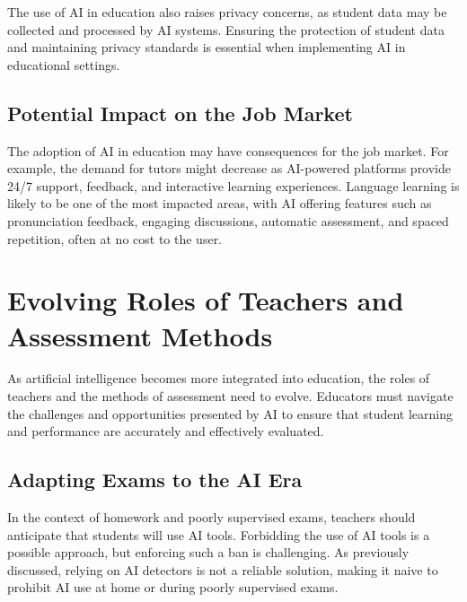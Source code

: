 \documentclass{article}
\begin{document}
The use of AI in education also raises privacy concerns, as student data may be collected and processed by AI systems. Ensuring the protection of student data and maintaining privacy standards is essential when implementing AI in educational settings.

\subsection{Potential Impact on the Job Market}

The adoption of AI in education may have consequences for the job market.
For example, the demand for tutors might decrease as AI-powered platforms
provide 24/7 support, feedback, and interactive learning experiences.
Language learning is likely to be one of the most impacted areas, with
AI offering features such as pronunciation feedback, engaging discussions,
automatic assessment, and spaced repetition, often at no cost to the user.






\newpage

\section{Evolving Roles of Teachers and Assessment Methods}

As artificial intelligence becomes more integrated into education, the roles of teachers and the methods of assessment need to evolve. Educators must navigate the challenges and opportunities presented by AI to ensure that student learning and performance are accurately and effectively evaluated.

\subsection{Adapting Exams to the AI Era}

In the context of homework and poorly supervised exams, teachers should anticipate that students will use AI tools. Forbidding the use of AI tools is a possible approach, but enforcing such a ban is challenging. As previously discussed, relying on AI detectors is not a reliable solution, making it naive to prohibit AI use at home or during poorly supervised exams.
\end{document}
